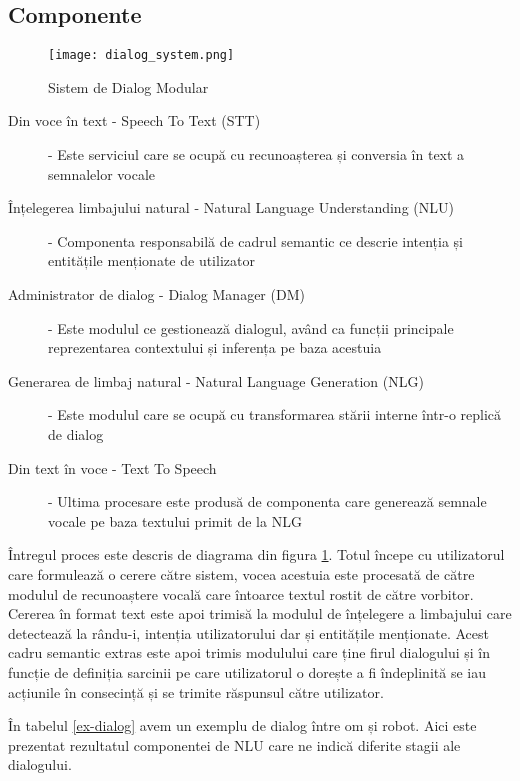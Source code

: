 \subsection{Componente}
\begin{figure}[h]
	\centering
	\texttt{[image: dialog\_system.png]}
	\caption{Sistem de Dialog Modular}
	\label{fig:ds_proc}
\end{figure}
\begin{description}
	\item[Din voce în text - Speech To Text (STT)]  - 
	Este serviciul care se ocupă cu recunoașterea și conversia în text a semnalelor vocale
	\item[Înțelegerea limbajului natural - Natural Language Understanding (NLU)] -
	Componenta responsabilă de cadrul semantic ce descrie intenția și entitățile menționate de utilizator
	\item[Administrator de dialog - Dialog Manager (DM)] - 
	Este modulul ce gestionează dialogul, având ca funcții principale reprezentarea contextului și inferența pe baza acestuia
	\item[Generarea de limbaj natural - Natural Language Generation (NLG)] -
	Este modulul care se ocupă cu transformarea stării interne într-o replică de dialog
	\item[Din text în voce - Text To Speech] - 
	Ultima procesare este produsă de componenta care generează semnale vocale pe baza textului primit de la NLG
\end{description}

Întregul proces este descris de diagrama din figura \ref{fig:ds_proc}. Totul începe cu utilizatorul care formulează o cerere către sistem, vocea acestuia este procesată de către modulul de recunoaștere vocală care întoarce textul rostit de către vorbitor. Cererea în format text este apoi trimisă la modulul de înțelegere a limbajului care detectează la rându-i, intenția utilizatorului dar și entitățile menționate. Acest cadru semantic extras este apoi trimis modulului care ține firul dialogului și în funcție de definiția sarcinii pe care utilizatorul o dorește a fi îndeplinită se iau acțiunile în consecință și se trimite răspunsul către utilizator.

În tabelul \ref{ex-dialog} avem un exemplu de dialog între om și robot. Aici este prezentat rezultatul componentei de NLU care ne indică diferite stagii ale dialogului.

